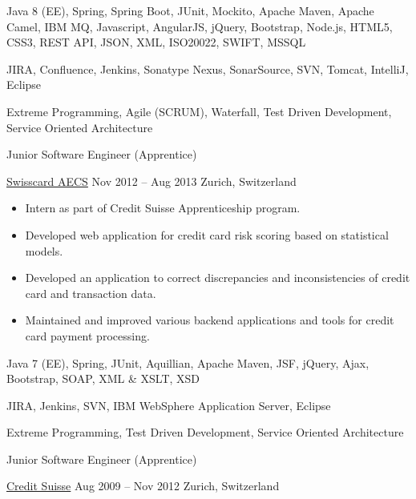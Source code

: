 \documentclass[11pt, a4paper, ragged2e, withhyper]{altacv}
\renewcommand{\cvevent}[4]{%
  {\Large\color{emphasis}#1\par}
  \medskip\normalsize
  \ifstrequal{#2}{}{}{
  	{#2}}
  \ifstrequal{#3}{}{}{{
  	\hspace{0.5em}
  	{#3}}}
  \ifstrequal{#4}{}{}{{
  	\hspace{0.5em}
  	{#4}}}\par
  \medskip\normalsize
}
\begin{document}
\begin{paracol}{2}
	\bigskip
	\begin{description}
	\small
		\item [Technologies:] Java 8 (EE), Spring, Spring Boot, JUnit, Mockito, Apache Maven, Apache Camel, IBM MQ, Javascript, AngularJS, jQuery, Bootstrap, Node.js, HTML5, CSS3, REST API, JSON, XML, ISO20022, SWIFT, MSSQL\smallskip
		\item [Tools] JIRA, Confluence, Jenkins, Sonatype Nexus, SonarSource, SVN, Tomcat, IntelliJ, Eclipse\smallskip
		\item [Methodologies] Extreme Programming, Agile (SCRUM), Waterfall, Test Driven Development, Service Oriented Architecture
	\end{description}

	\newpage

	\cvevent{Junior Software Engineer (Apprentice)}{\href{https://www.swisscard.ch/en/}{Swisscard AECS}}{Nov 2012 -- Aug 2013}{Zurich, Switzerland}

	\bigskip
	\begin{itemize}[label=\color{bullet}\textbullet]
		\item Intern as part of Credit Suisse Apprenticeship program.
		\item Developed web application for credit card risk scoring based on statistical models.
		\item Developed an application to correct discrepancies and inconsistencies of credit card and transaction data.
		\item Maintained and improved various backend applications and tools for credit card payment processing.
	\end{itemize}

	\bigskip
	\begin{description}
		\small
		\item [Technologies:] Java 7 (EE), Spring, JUnit, Aquillian, Apache Maven, JSF, jQuery, Ajax, Bootstrap, SOAP, XML \& XSLT, XSD
		\item [Tools:] JIRA, Jenkins, SVN, IBM WebSphere Application Server, Eclipse
		\item [Methodologies:] Extreme Programming, Test Driven Development, Service Oriented Architecture
	\end{description}

	\bigskip\bigskip

	\cvevent{Junior Software Engineer (Apprentice)}{\href{https://www.credit-suisse.com/ch/en.html}{Credit Suisse}}{Aug 2009 -- Nov 2012}{Zurich, Switzerland}


\end{paracol}
\end{document}
